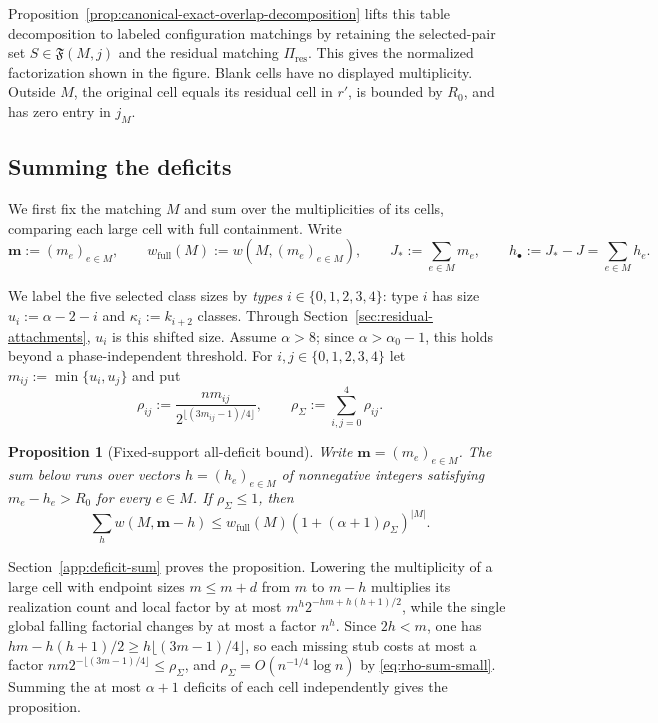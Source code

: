 \documentclass[a4paper,10pt,reqno]{amsart}
\numberwithin{equation}{section}
\theoremstyle{plain}
\newtheorem{proposition}[theorem]{Proposition}
\theoremstyle{remark}
\begin{document}
Proposition~\ref{prop:canonical-exact-overlap-decomposition} lifts this
table decomposition to labeled configuration matchings by retaining the
selected-pair set \(S\in\mathfrak F(M,j)\) and the residual matching
\(\Pi_{\mathrm{res}}\). This gives the normalized factorization shown in
the figure. Blank cells have no displayed multiplicity. Outside \(M\), the
original cell equals its residual cell in \(r'\), is bounded by \(R_0\),
and has zero entry in \(j_M\).

\subsection{Summing the deficits}
\label{subsec:deficit-sum}

We first fix the matching $M$ and sum over the multiplicities of its cells,
comparing each large cell with full containment.
Write
\[
  \mathbf m:=(m_e)_{e\in M},
  \qquad
  w_{\mathrm{full}}(M):=w(M,(m_e)_{e\in M}),
  \qquad
  J_*:=\sum_{e\in M}m_e,
  \qquad
  h_\bullet:=J_*-J=\sum_{e\in M}h_e.
\]

We label the five selected class sizes by \emph{types} $i\in\{0,1,2,3,4\}$:
type $i$ has size $u_i:=\alpha-2-i$ and $\kappa_i:=k_{i+2}$ classes.
Through Section~\ref{sec:residual-attachments}, $u_i$ is this shifted size.
Assume $\alpha>8$; since $\alpha>\alpha_0-1$, this holds beyond a
phase-independent threshold. For
$i,j\in\{0,1,2,3,4\}$ let $m_{ij}:=\min\{u_i,u_j\}$ and put
\[
  \rho_{ij}
  :=
  \frac{n m_{ij}}{2^{\lfloor(3m_{ij}-1)/4\rfloor}},
  \qquad
  \rho_{\Sigma}:=\sum_{i,j=0}^{4}\rho_{ij}.
\]

\begin{proposition}[Fixed-support all-deficit bound]
\label{prop:fixed-support-all-deficit}
Write $\mathbf m=(m_e)_{e\in M}$. The sum below runs over vectors
$h=(h_e)_{e\in M}$ of nonnegative integers satisfying $m_e-h_e>R_0$ for every
$e\in M$. If $\rho_{\Sigma}\le1$, then
\begin{equation}
  \sum_h
    w(M,\mathbf m-h)
  \le
  w_{\mathrm{full}}(M)
  \left(1+(\alpha+1)\rho_{\Sigma}\right)^{|M|}.
  \label{eq:fixed-support-all-deficit}
\end{equation}
\end{proposition}

Section~\ref{app:deficit-sum} proves the proposition. Lowering the
multiplicity of a large cell with endpoint sizes $m\le m+d$ from $m$ to
$m-h$ multiplies its realization count and local factor by at most
$m^h2^{-hm+h(h+1)/2}$, while the single global falling factorial changes by
at most a factor $n^h$. Since $2h<m$, one has
$hm-h(h+1)/2\ge h\lfloor(3m-1)/4\rfloor$, so each missing stub costs at most
a factor $nm2^{-\lfloor(3m-1)/4\rfloor}\le\rho_\Sigma$, and
$\rho_\Sigma=O(n^{-1/4}\log n)$ by \eqref{eq:rho-sum-small}. Summing the at
most $\alpha+1$ deficits of each cell independently gives the proposition.
\end{document}
